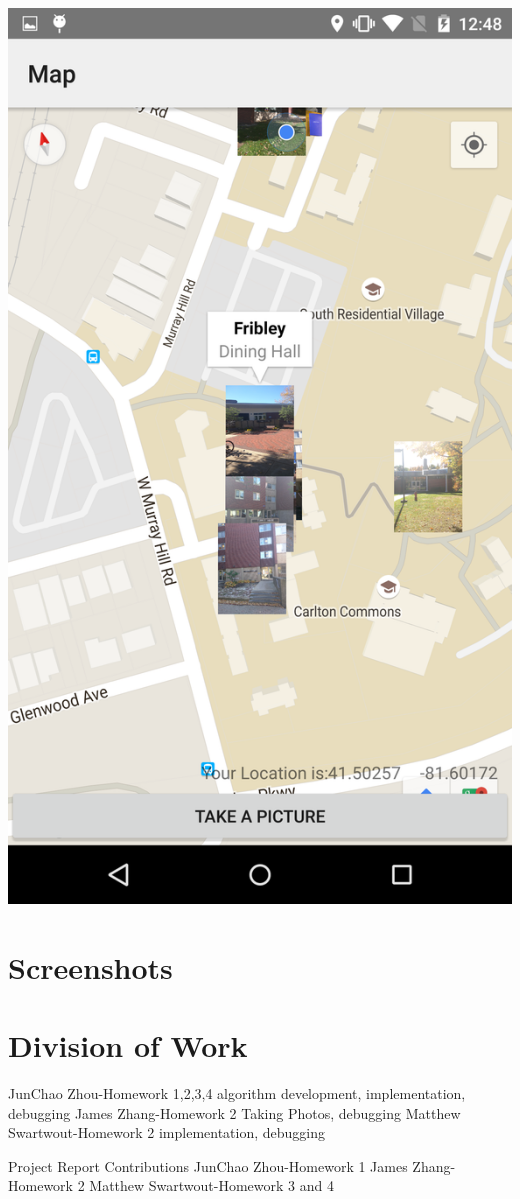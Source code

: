 \documentclass[]{article}
\begin{document}
\includegraphics[keepaspectratio, width=\textwidth]{mapMarker2}

\section{Screenshots}
\section{Division of Work}
JunChao Zhou-Homework 1,2,3,4 algorithm development, implementation, debugging
James Zhang-Homework 2 Taking Photos, debugging
Matthew Swartwout-Homework 2 implementation, debugging

Project Report Contributions
JunChao Zhou-Homework 1
James Zhang-Homework 2
Matthew Swartwout-Homework 3 and 4
\end{document}
